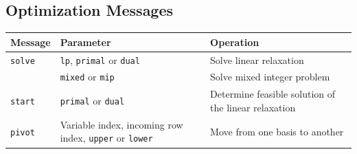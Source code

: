 \documentclass[a4paper,11pt,twoside]{book}
\begin{document}
\subsection{Optimization Messages}
\medskip
\begin{center}
\begin{tabular}{|p{3cm}|p{9cm}|p{12.5cm}|}
\hline
{\bf Message}       & {\bf Parameter} & {\bf Operation} \\
\hline
\hline
\verb/solve/        & \verb/lp/, \verb/primal/ or \verb/dual/
                    & Solve linear relaxation \\
\hline
                    & \verb/mixed/ or \verb/mip/
                    & Solve mixed integer problem \\
\hline
\verb/start/        & \verb/primal/ or \verb/dual/
                    & Determine feasible solution of
                      the linear relaxation \\
\hline
\verb/pivot/        & Variable index, incoming row
                      index, \verb/upper/ or \verb/lower/
                    & Move from one basis to another \\
\hline
\end{tabular}
\end{center}
\end{document}
